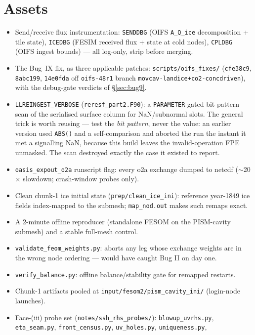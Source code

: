 \documentclass[11pt,a4paper]{article}
\newcommand{\code}[1]{\texttt{\small #1}}
\begin{document}
\section{Assets}

\begin{itemize}
\item Send/receive flux instrumentation: \code{SENDDBG} (OIFS \code{A\_Q\_ice} decomposition +
  tile state), \code{ICEDBG} (FESIM received flux + state at cold nodes), \code{CPLDBG} (OIFS
  ingest bounds) --- all log-only, strip before merging.
\item The Bug~IX fix, as three applicable patches: \code{scripts/oifs\_fixes/} (\code{cfe38c9},
  \code{8abc199}, \code{14e0fda} off \code{oifs-48r1} branch
  \code{movcav-landice+co2-concdriven}), with the debug-gate verdicts of \S\ref{sec:bug9}.
\item \code{LLREINGEST\_VERBOSE} (\code{reresf\_part2.F90}): a \code{PARAMETER}-gated bit-pattern
  scan of the serialised surface column for NaN/subnormal slots. The general trick is worth
  reusing --- test the \emph{bit pattern}, never the value: an earlier version used \code{ABS()}
  and a self-comparison and aborted the run the instant it met a signalling NaN, because this
  build leaves the invalid-operation FPE unmasked. The scan destroyed exactly the case it existed
  to report.
\item \code{oasis\_expout\_o2a} runscript flag: every o2a exchange dumped to netcdf
  ($\sim$20$\times$ slowdown; crash-window probes only).
\item Clean chunk-1 ice initial state (\code{prep/clean\_ice\_ini}): reference year-1849 ice fields
  index-mapped to the submesh; \code{map\_nod.out} makes such remaps exact.
\item A 2-minute offline reproducer (standalone FESOM on the PISM-cavity submesh) and a stable
  full-mesh control.
\item \code{validate\_feom\_weights.py}: aborts any leg whose exchange weights are in the wrong
  node ordering --- would have caught Bug II on day one.
\item \code{verify\_balance.py}: offline balance/stability gate for remapped restarts.
\item Chunk-1 artifacts pooled at \code{input/fesom2/pism\_cavity\_ini/} (login-node launches).
\item Face-(iii) probe set (\code{notes/ssh\_rhs\_probes/}): \code{blowup\_uvrhs.py},
  \code{eta\_seam.py}, \code{front\_census.py}, \code{uv\_holes.py}, \code{uniqueness.py},

\end{itemize}
\end{document}
